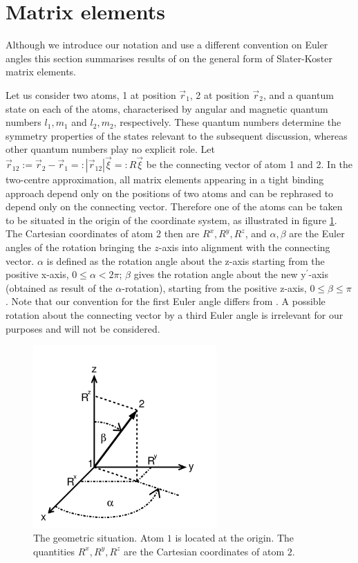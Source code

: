 \section{Matrix elements}
\label{ME}
%
\par{Although we introduce our notation and use a different convention on Euler
angles this section summarises results
of \citep{Podolskiy04} on the general form of Slater-Koster matrix elements.}
\par{Let us consider two atoms, 1 at position $\vec{r}_{1}$, 2 at position $\vec{r}_{2}$, and a quantum
state on each of the atoms, characterised by angular and magnetic quantum numbers \(l_1,m_1\)
and \(l_2,m_2\), respectively. These quantum numbers determine the
symmetry properties of the states relevant to the subsequent discussion, whereas other quantum numbers play
no explicit role.
Let $\vec{r}_{12}:=\vec{r}_{2}-\vec{r}_{1}=:|\vec{r}_{12}|\vec{\xi}=:R\vec{\xi}$ be
the connecting vector of atom 1 and 2. In the two-centre approximation, all matrix elements appearing in
a tight binding approach depend only on the positions of two atoms and can be rephrased to depend only
on the connecting vector. Therefore one of the atoms can be taken to be situated in the origin of
the coordinate system, as illustrated in figure \ref{geometry}. The Cartesian coordinates of
atom 2 then are
\(R^x,R^y,R^z\), and $\alpha,\beta$ are the Euler angles of the rotation bringing the $z$-axis into
alignment with the connecting vector. $\alpha$ is defined as the
rotation angle about the z-axis starting from the positive x-axis, $0\le\alpha<2\pi$; $\beta$ gives the
rotation angle about the new y$^{\prime}$-axis (obtained as result of the $\alpha$-rotation),
starting from the positive z-axis, $0\le\beta\le\pi$. Note that our convention for the first Euler angle
differs from \citep{Podolskiy04}. A possible rotation about the connecting vector by a third Euler angle is
irrelevant for our purposes and will not be considered. }
%
\begin{figure}[t]
\begin{center}
\includegraphics[width=7cm]{figures/Abbildung1}
\end{center}
\caption[The geometric situation]{The geometric situation. Atom $1$ is located at the origin.
The quantities $R^{x},R^{y},R^{z}$ are the Cartesian coordinates of atom $2$.}
\label{geometry}
\end{figure}
